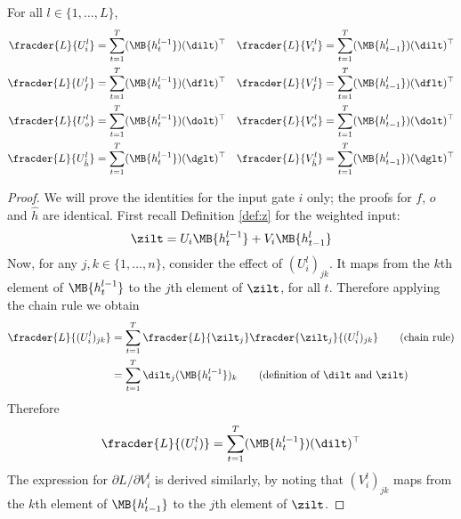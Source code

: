 \begin{lemma}
\label{lem:weight_derivs}
For all $l \in \{1,\dots,L\}$,
\begin{align*}
\fracder{L}{U_i^l} &= \sum_{t=1}^T (\MB{h_t^{l-1}}) (\dilt)^\top 
&\fracder{L}{V_i^l} &= \sum_{t=1}^T (\MB{h_{t-1}^l}) (\dilt)^\top \\
\fracder{L}{U_f^l} &= \sum_{t=1}^T (\MB{h_t^{l-1}}) (\dflt)^\top 
&\fracder{L}{V_f^l} &= \sum_{t=1}^T (\MB{h_{t-1}^l}) (\dflt)^\top \\
\fracder{L}{U_o^l} &= \sum_{t=1}^T (\MB{h_t^{l-1}}) (\dolt)^\top 
&\fracder{L}{V_o^l} &= \sum_{t=1}^T (\MB{h_{t-1}^l}) (\dolt)^\top \\
\fracder{L}{U_{\hat{h}}^l} &= \sum_{t=1}^T (\MB{h_t^{l-1}}) (\dglt)^\top 
&\fracder{L}{V_{\hat{h}}^l} &= \sum_{t=1}^T (\MB{h_{t-1}^l}) (\dglt)^\top 
\end{align*}
\end{lemma}
\begin{proof}
We will prove the identities for the input gate $i$ only; the proofs for $f$, $o$ and $\hat{h}$ are identical.
First recall Definition \ref{def:z} for the weighted input:
\begin{equation*}
\zilt = U_i \MB{h_t^{l-1}} + V_i \MB{h_{t-1}^l} 
\end{equation*}
Now, for any $j,k \in \{1,\dots,n\}$, consider the effect of $(U_i^l)_{jk}$. It maps from the $k$th element of $\MB{h_t^{l-1}}$ to the $j$th element of $\zilt$, for all $t$. Therefore applying the chain rule we obtain
\begin{align}
\fracder{L}{(U_i^l)_{jk}} &= \sum_{t=1}^T \fracder{L}{\zilt_j} \fracder{\zilt_j}{(U_i^l)_{jk}} \tag{chain rule} \\
&= \sum_{t=1}^T \dilt_j (\MB{h_t^{l-1}})_k \tag{definition of $\dilt$ and $\zilt$}
\end{align}
Therefore
\begin{align}
\fracder{L}{(U_i^l)} = \sum_{t=1}^T  (\MB{h_t^{l-1}}) (\dilt)^\top
\end{align}
The expression for $\partial L / \partial V_i^l$ is derived similarly, by noting that $(V_i^l)_{jk}$ maps from the $k$th element of $\MB{h_{t-1}^l}$ to the $j$th element of $\zilt$.
\end{proof}

